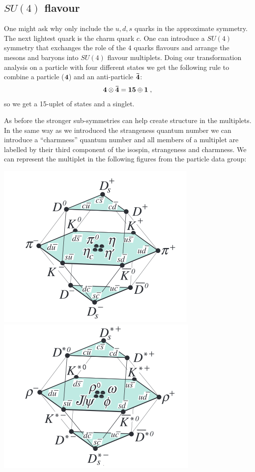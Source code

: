 \documentclass[12pt]{article}
\begin{document}
\subsection{$SU(4)$ flavour}
One might ask why only include the $u,d,s$ quarks in the approximate symmetry. The next lightest quark is the charm quark $c$. One can introduce a $SU(4)$ symmetry that exchanges the role of the $4$ quarks flavours and arrange the mesons and baryons into $SU(4)$ flavour multiplets. Doing our transformation analysis on a particle with four different states we get the following rule to combine a particle ($\bf 4$) and an anti-particle $\bf \bar 4$: 
\[{\bf 4}\otimes {\bf \bar{4}}={\bf 15}\oplus {\bf 1}\;,\]
so we get a 15-uplet of states and a singlet. 

As before the stronger sub-symmetries can help create structure in the multiplets. In the same way as we introduced the strangeness quantum number we can introduce a ``charmness'' quantum number and all members of a multiplet are labelled by their third component of the isospin, strangeness and charmness. We can represent the multiplet in the following figures from the particle data group:

\includegraphics[scale=0.4]{images/mesonsCa.png}
\includegraphics[scale=0.4]{images/mesonsCb.png}
\end{document}

